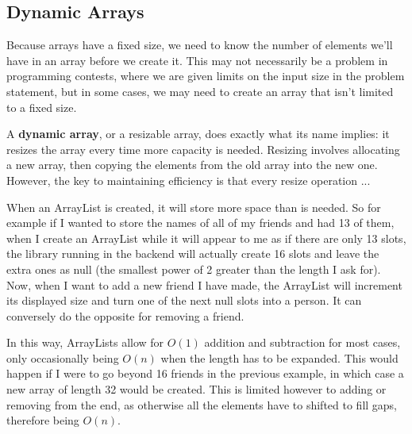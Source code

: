 
\subsection{Dynamic Arrays}

Because arrays have a fixed size, we need to know the number of elements we'll have in an array before we create it. This may not necessarily be a problem in programming contests, where we are given limits on the input size in the problem statement, but in some cases, we may need to create an array that isn't limited to a fixed size.

A \textbf{dynamic array}, or a resizable array, does exactly what its name implies: it resizes the array every time more capacity is needed. Resizing involves allocating a new array, then copying the elements from the old array into the new one. However, the key to maintaining efficiency is that every resize operation ...

When an ArrayList is created, it will store more space than is needed. So for example if I wanted to store the names of all of my friends and had 13 of them, when I create an ArrayList while it will appear to me as if there are only 13 slots, the library running in the backend will actually create 16 slots and leave the extra ones as null (the smallest power of 2 greater than the length I ask for). Now, when I want to add a new friend I have made, the ArrayList will increment its displayed size and turn one of the next null slots into a person. It can conversely do the opposite for removing a friend.

In this way, ArrayLists allow for $O(1)$ addition and subtraction for most cases, only occasionally being $O(n)$ when the length has to be expanded. This would happen if I were to go beyond 16 friends in the previous example, in which case a new array of length 32 would be created. This is limited however to adding or removing from the end, as otherwise all the elements have to shifted to fill gaps, therefore being $O(n)$.


